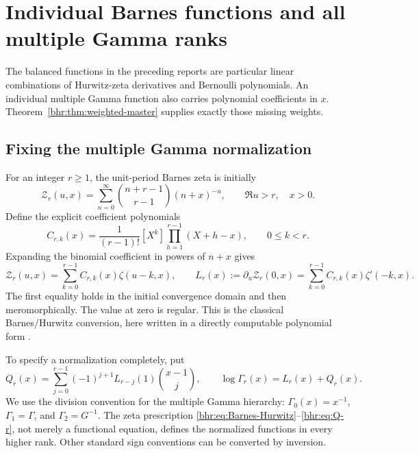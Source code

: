 \section{Individual Barnes functions and all multiple Gamma ranks}
\label{bhr:sec:barnes}

The balanced functions in the preceding reports are particular
linear combinations of Hurwitz-zeta derivatives and Bernoulli
polynomials. An individual multiple Gamma function also carries
polynomial coefficients in $x$. Theorem~\ref{bhr:thm:weighted-master}
supplies exactly those missing weights.

\subsection{Fixing the multiple Gamma normalization}

For an integer $r\ge1$, the unit-period Barnes zeta is initially
\begin{equation}\label{bhr:eq:barnes-zeta}
 \mathcal Z_r(u,x)=\sum_{n=0}^{\infty}
        \binom{n+r-1}{r-1}(n+x)^{-u},\qquad \Re u>r,\quad x>0.
\end{equation}
Define the explicit coefficient polynomials
\begin{equation}\label{bhr:eq:C-rk}
 C_{r,k}(x)=\frac1{(r-1)!}[X^k]
                      \prod_{h=1}^{r-1}(X+h-x),\qquad 0\le k<r.
\end{equation}
Expanding the binomial coefficient in powers of $n+x$ gives
\begin{equation}\label{bhr:eq:Barnes-Hurwitz}
 \mathcal Z_r(u,x)=\sum_{k=0}^{r-1}C_{r,k}(x)\zeta(u-k,x),\qquad
 L_r(x):=\partial_u\mathcal Z_r(0,x)
       =\sum_{k=0}^{r-1}C_{r,k}(x)\zeta'(-k,x).
\end{equation}
The first equality holds in the initial convergence domain and
then meromorphically. The value at zero is regular. This is the
classical Barnes/Hurwitz conversion, here written in a directly
computable polynomial form \cite{bhr:Adamchik,bhr:Vardi}.

To specify a normalization completely, put
\begin{equation}\label{bhr:eq:Q-r}
 Q_r(x)=\sum_{j=0}^{r-1}(-1)^{j+1}L_{r-j}(1)
                          \binom{x-1}{j},\qquad
 \log\Gamma_r(x)=L_r(x)+Q_r(x).
\end{equation}
We use the division convention for the multiple Gamma hierarchy:
$\Gamma_0(x)=x^{-1}$, $\Gamma_1=\Gamma$, and
$\Gamma_2=G^{-1}$. The zeta prescription
\eqref{bhr:eq:Barnes-Hurwitz}--\eqref{bhr:eq:Q-r}, not merely a functional
equation, defines the normalized functions in every higher rank.
Other standard sign conventions can be converted by inversion.

